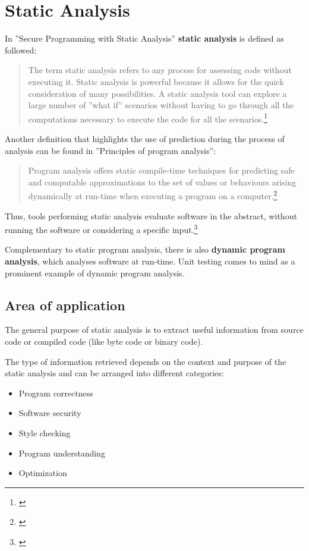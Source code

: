 \chapter{Static Analysis}

In ''Secure Programming with Static Analysis'' \textbf{static analysis} is defined as followed:

\begin{quotation}
The term static analysis refers to any process for assessing code without
executing it. Static analysis is powerful because it allows for the quick consideration of many possibilities. A static analysis tool can explore a large number of ''what if'' scenarios without having to go through all the computations
necessary to execute the code for all the scenarios.\footnote{\citep[3]{SecureProgramming}}
\end{quotation}

Another definition that highlights the use of prediction during the process of analysis can be found in ''Principles of program analysis'':

\begin{quotation}
Program analysis offers static compile-time techniques for predicting safe and computable approximations to the set of values or behaviours arising dynamically at run-time when executing a program on a computer.\footnote{\citep[1]{ProgramAnalysis}}
\end{quotation}

Thus, tools performing static analysis evaluate software in the abstract, without running the software or considering a specific input.\footnote{\citep{UsingSAToFindBugs}}

Complementary to static program analysis, there is also \textbf{dynamic program analysis}, which analyses software at run-time. Unit testing comes to mind as a prominent example of dynamic program analysis.

\section{Area of application}

The general purpose of static analysis is to extract useful information from source code or compiled code (like byte code or binary code).

The type of information retrieved depends on the context and purpose of the static analysis and can be arranged into different categories:

\begin{itemize}\addtolength{\itemsep}{-0.5\baselineskip}
\item Program correctness
\item Software security
\item Style checking
\item Program understanding
\item Optimization
\end{itemize}

